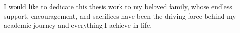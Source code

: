 \begin{center}
\vspace*{0.32\textheight}
I would like to dedicate this thesis work to my beloved family, whose endless support,
encouragement, and sacrifices have been the driving force behind my academic journey and
everything I achieve in life.
\end{center}
